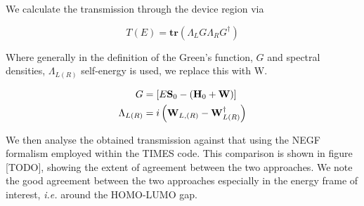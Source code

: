 We calculate the transmission through the device region via

\begin{equation}
	T(E) = \mathbf{tr}(\Lambda_L G \Lambda_R G^\dagger)	
	\label{eq:transmission}
\end{equation}

Where generally in the definition of the Green's function, $G$ and spectral
densities, $\Lambda_{L(R)}$ self-energy is used, we replace this with W.

\begin{subequations}
\begin{align}
	G &= [E\mathbf{S}_0 - (\mathbf{H}_0 + \mathbf{W})] \\
	\Lambda_{L(R)} &= i \left( \mathbf{W}_{L,(R)}
	                  - \mathbf{W}^\dagger_{L(R)} \right)
\end{align}
\label{eq:glambdadef}
\end{subequations}

We then analyse the obtained transmission against that using the NEGF formalism
employed within the TIMES code. This comparison is shown in figure [TODO],
showing the extent of agreement between the two approaches. We note the good
agreement between the two approaches especially in the energy frame of
interest, \textit{i.e.} around the \ac{HOMO}-\ac{LUMO} gap.

% 
% 
% 


